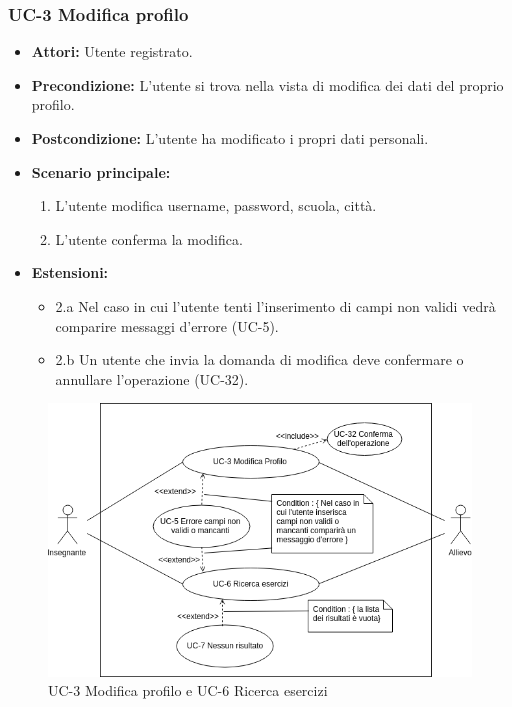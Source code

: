\subsubsection{UC-3 Modifica profilo}
		\begin{itemize}
			\item \textbf{Attori:} Utente registrato. 
			\item \textbf{Precondizione:} L'utente si trova nella vista di modifica dei dati del proprio profilo.
			\item \textbf{Postcondizione:} L'utente ha modificato i propri dati personali.
			\item \textbf{Scenario principale:}
				\begin{enumerate}
					\item L'utente modifica username, password, scuola, città.
					\item L'utente conferma la modifica. 
				\end{enumerate}
				\item \textbf{Estensioni:}
				\begin{itemize}
					\item 2.a Nel caso in cui l'utente tenti l'inserimento di campi non validi vedrà comparire messaggi d'errore (UC-5).
					\item 2.b Un utente che invia la domanda di modifica deve confermare o annullare l'operazione (UC-32).
				\end{itemize}
		\end{itemize}
		\begin{figure}[htbp]
		\centering
		\includegraphics[scale=0.7]{images/UC-3.png}
		\caption{UC-3 Modifica profilo e UC-6 Ricerca esercizi}
	\end{figure}
	
